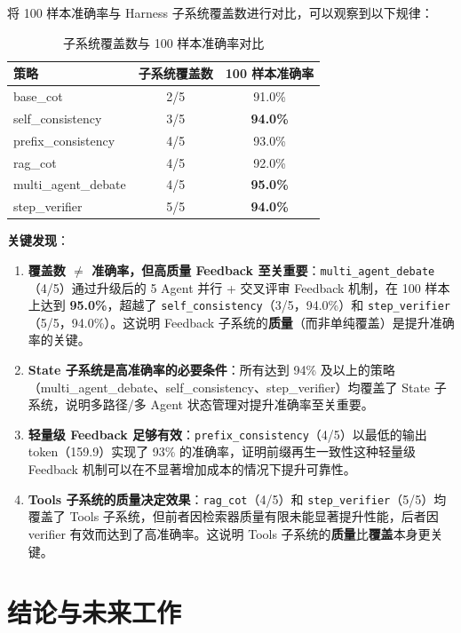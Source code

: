 \documentclass[lang=cn,a4paper,newtx]{elegantpaper}
\begin{document}
将 100 样本准确率与 Harness 子系统覆盖数进行对比，可以观察到以下规律：

\begin{table}[htbp]
\centering
\caption{子系统覆盖数与 100 样本准确率对比}
\begin{tabular}{lcc}
\toprule
策略 & 子系统覆盖数 & 100 样本准确率 \\
\midrule
base\_cot & 2/5 & 91.0\% \\
self\_consistency & 3/5 & \textbf{94.0\%} \\
prefix\_consistency & 4/5 & 93.0\% \\
rag\_cot & 4/5 & 92.0\% \\
multi\_agent\_debate & 4/5 & \textbf{95.0\%} \\
step\_verifier & 5/5 & \textbf{94.0\%} \\
\bottomrule
\end{tabular}
\end{table}

\textbf{关键发现}：

\begin{enumerate}
  \item \textbf{覆盖数 $\neq$ 准确率，但高质量 Feedback 至关重要}：\texttt{multi\_agent\_debate}（4/5）通过升级后的 5 Agent 并行 + 交叉评审 Feedback 机制，在 100 样本上达到 \textbf{95.0\%}，超越了 \texttt{self\_consistency}（3/5，94.0\%）和 \texttt{step\_verifier}（5/5，94.0\%）。这说明 Feedback 子系统的\textbf{质量}（而非单纯覆盖）是提升准确率的关键。
  \item \textbf{State 子系统是高准确率的必要条件}：所有达到 94\% 及以上的策略（multi\_agent\_debate、self\_consistency、step\_verifier）均覆盖了 State 子系统，说明多路径/多 Agent 状态管理对提升准确率至关重要。
  \item \textbf{轻量级 Feedback 足够有效}：\texttt{prefix\_consistency}（4/5）以最低的输出 token（159.9）实现了 93\% 的准确率，证明前缀再生一致性这种轻量级 Feedback 机制可以在不显著增加成本的情况下提升可靠性。
  \item \textbf{Tools 子系统的质量决定效果}：\texttt{rag\_cot}（4/5）和 \texttt{step\_verifier}（5/5）均覆盖了 Tools 子系统，但前者因检索器质量有限未能显著提升性能，后者因 verifier 有效而达到了高准确率。这说明 Tools 子系统的\textbf{质量}比\textbf{覆盖}本身更关键。
\end{enumerate}

\section{结论与未来工作}
\end{document}
